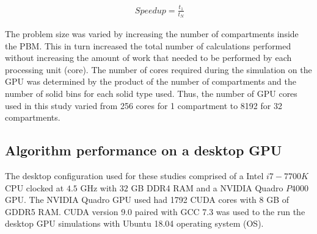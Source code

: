 \documentclass[preprint,10pt,authoryear,review]{elsarticle}
\begin{document}
\begin{linenumbers}
\begin{align}
\ Speedup = \frac{t_1}{t_N}
\label{eqn:result_parallelefficiencyWeak}
\end{align}

The problem size was varied by increasing the number of compartments inside 
the PBM. This in turn increased the total number of calculations performed 
without increasing the amount of work that needed to be performed by each 
processing unit (core). The number of cores required during the simulation 
on the GPU was determined by the product of the number of compartments and 
the number of solid bins for each solid type used. Thus, the number of GPU 
cores used in this study varied from 256 cores for 1 compartment to 8192 
for 32 compartments.



\subsection{Algorithm performance on a desktop GPU}
The desktop configuration used for these studies comprised of a Intel $i7-7700K$  
CPU clocked at $4.5$ GHz with $32$ GB DDR4 RAM and a NVIDIA Quadro $P4000$ GPU. 
The NVIDIA Quadro GPU used had 1792 CUDA cores with 8 GB of GDDR5 RAM. 
CUDA version 9.0 paired with GCC 7.3 was used to the run the desktop GPU simulations 
with Ubuntu 18.04 operating system (OS).



\end{linenumbers}
\end{document}

